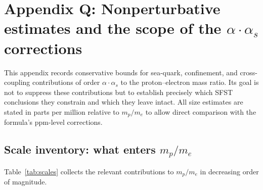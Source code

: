 
\section{Appendix Q: Nonperturbative estimates and the scope of the
  $\alpha\cdot\alpha_s$ corrections}
\label{app:nonperturbative}

This appendix records conservative bounds for sea-quark,
confinement, and cross-coupling contributions of order
$\alpha\cdot\alpha_s$ to the proton--electron mass ratio.  Its goal
is not to suppress these contributions but to establish precisely
which SFST conclusions they constrain and which they leave intact.
All size estimates are stated in parts per million relative to
$m_p/m_e$ to allow direct comparison with the formula's ppm-level
corrections.

\subsection{Scale inventory: what enters $m_p/m_e$}
\label{ssec:scaleInventory}

Table~\ref{tab:scales} collects the relevant contributions to
$m_p/m_e$ in decreasing order of magnitude.

